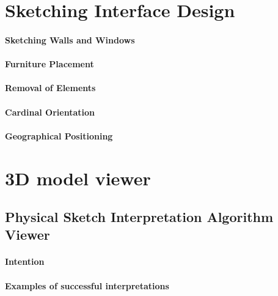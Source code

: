 	\section{Sketching Interface Design}
		\paragraph{Sketching Walls and Windows}
		\paragraph{Furniture Placement}
		\paragraph{Removal of Elements}
		\paragraph{Cardinal Orientation}
		\paragraph{Geographical Positioning}

	\section{3D model viewer}

		\subsection{Physical Sketch Interpretation Algorithm Viewer}
			\paragraph{Intention}
			\paragraph{Examples of successful interpretations}
